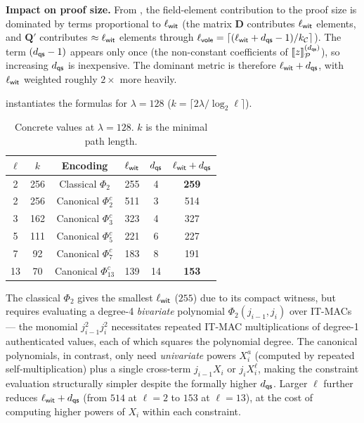 \documentclass[11pt,a4paper]{article}
\theoremstyle{definition}
\theoremstyle{remark}
\newcommand{\calC}{\mathcal{C}}
\newcommand{\itmacP}[1]{\llbracket {#1} \rrbracket_{\calP}}
\newcommand{\calP}{\mathcal{P}}
\newcommand{\polyrel}{\Phi}
\newcommand{\mat}[1]{\mathbf{#1}}
\begin{document}
\medskip\noindent
\textbf{Impact on proof size.}
From , the field-element contribution to the proof size is
dominated by terms proportional to $\ell_{\sf wit}$ (the matrix $\mat{D}$
contributes $\ell_{\sf wit}$ elements, and $\mat{Q}'$ contributes
$\approx \ell_{\sf wit}$ elements through $\ell_{\sf vole} = \lceil(\ell_{\sf wit}
+ d_{\sf qs} - 1)/k_{\calC}\rceil$).
The term $(d_{\sf qs}-1)$ appears only once (the non-constant coefficients of
$\itmacP{z}^{(d_{\sf qs})}$), so increasing $d_{\sf qs}$ is inexpensive.
The dominant metric is therefore $\ell_{\sf wit} + d_{\sf qs}$, with $\ell_{\sf wit}$
weighted roughly $2\times$ more heavily.

 instantiates the formulas for $\lambda = 128$
($k = \lceil 2\lambda / \log_2 \ell \rceil$).

\begin{table}[H]
	\centering
	\caption{Concrete values at $\lambda = 128$. $k$ is the minimal path length.}
	\label{tab:wit-deg-concrete}
	\begin{tabular}{c c c c c c}
		\toprule
		$\ell$ & $k$ & Encoding & $\ell_{\sf wit}$ & $d_{\sf qs}$ &
			$\ell_{\sf wit} + d_{\sf qs}$ \\
		\midrule
		2  & 256 & Classical $\polyrel_2$  & 255 & 4  & {\bf 259} \\
		2  & 256 & Canonical $\polyrel_2^c$ & 511 & 3  & 514 \\
		3  & 162 & Canonical $\polyrel_3^c$ & 323 & 4  & 327 \\
		5  & 111 & Canonical $\polyrel_5^c$ & 221 & 6  & 227 \\
		7  & 92  & Canonical $\polyrel_7^c$ & 183 & 8  & 191 \\
		13 & 70  & Canonical $\polyrel_{13}^c$ & 139 & 14 & {\bf 153} \\
		\bottomrule
	\end{tabular}
\end{table}

The classical $\polyrel_2$ gives the smallest $\ell_{\sf wit}$ ($255$) due to
its compact witness, but requires evaluating a degree-4 \emph{bivariate} polynomial
$\polyrel_2(j_{i-1}, j_i)$ over IT-MACs --- the monomial $j_{i-1}^2 j_i^2$
necessitates repeated IT-MAC multiplications of degree-1 authenticated values,
each of which squares the polynomial degree.
The canonical polynomials, in contrast, only need \emph{univariate} powers
$X_i^a$ (computed by repeated self-multiplication) plus a single cross-term
$j_{i-1}X_i$ or $j_i X_i^{\ell}$, making the constraint evaluation structurally
simpler despite the formally higher $d_{\sf qs}$.
Larger $\ell$ further reduces $\ell_{\sf wit} + d_{\sf qs}$ (from $514$ at
$\ell=2$ to $153$ at $\ell=13$), at the cost of computing higher powers of
$X_i$ within each constraint.
\end{document}

